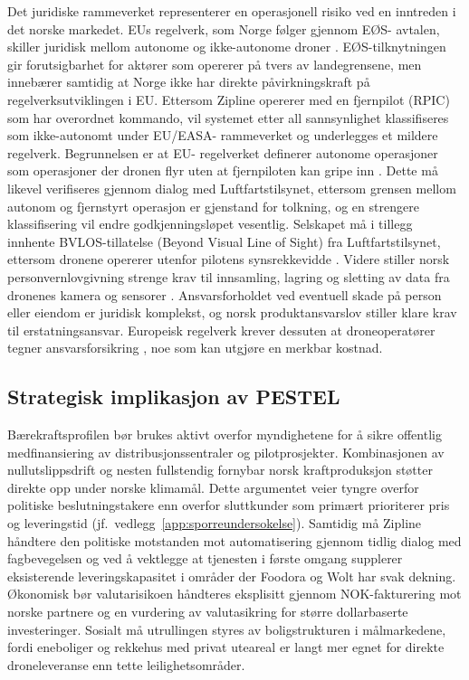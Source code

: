 Det juridiske rammeverket representerer en operasjonell risiko ved en
inntreden i det norske markedet. EUs regelverk, som Norge følger gjennom EØS-%
avtalen, skiller juridisk mellom autonome og ikke-autonome droner
\parencite{euuas2021}. EØS-tilknytningen gir forutsigbarhet for aktører som
opererer på tvers av landegrensene, men innebærer samtidig at Norge ikke
har direkte påvirkningskraft på regelverksutviklingen i EU. Ettersom Zipline
opererer med en fjernpilot (RPIC) som har overordnet kommando, vil systemet
etter all sannsynlighet klassifiseres som ikke-autonomt under EU/EASA-%
rammeverket og underlegges et mildere regelverk. Begrunnelsen er at EU-%
regelverket
definerer autonome operasjoner som operasjoner der dronen flyr uten at
fjernpiloten kan gripe inn \parencite{eu2019_947}. Dette må likevel
verifiseres
gjennom dialog med Luftfartstilsynet, ettersom grensen mellom autonom og
fjernstyrt operasjon er gjenstand for tolkning, og en strengere
klassifisering vil endre godkjenningsløpet vesentlig. Selskapet må i tillegg
innhente BVLOS-tillatelse (Beyond Visual Line of Sight) fra
Luftfartstilsynet, ettersom dronene opererer utenfor pilotens synsrekkevidde
\parencite{luftfartstilsynet2025_aicn0925}. Videre stiller norsk
personvernlovgivning strenge krav til innsamling, lagring og sletting av
data fra dronenes kamera og sensorer \parencite{personopplysningsloven2018}.
Ansvarsforholdet ved eventuell skade på person eller eiendom er juridisk
komplekst, og norsk produktansvarslov stiller klare krav til
erstatningsansvar. Europeisk regelverk krever dessuten at droneoperatører
tegner ansvarsforsikring \parencite{eu785_2004}, noe som kan utgjøre en
merkbar kostnad.

\subsection{Strategisk implikasjon av PESTEL}
Bærekraftsprofilen bør brukes aktivt overfor myndighetene for å sikre
offentlig medfinansiering av distribusjonssentraler og pilotprosjekter.
Kombinasjonen av nullutslippsdrift og nesten fullstendig fornybar norsk
kraftproduksjon støtter direkte opp under norske klimamål.
Dette argumentet veier tyngre overfor politiske beslutningstakere enn overfor sluttkunder som
primært prioriterer pris og leveringstid (jf.\ vedlegg~\ref{app:sporreundersokelse}).
Samtidig må Zipline håndtere den politiske motstanden mot automatisering
gjennom tidlig dialog med fagbevegelsen og ved å vektlegge at tjenesten i
første omgang supplerer eksisterende leveringskapasitet i områder der
Foodora og Wolt har svak dekning.
Økonomisk bør valutarisikoen håndteres eksplisitt gjennom NOK-fakturering
mot norske partnere og en vurdering av valutasikring for større
dollarbaserte investeringer. Sosialt må utrullingen styres av boligstrukturen
i målmarkedene, fordi eneboliger og rekkehus med privat uteareal er langt mer
egnet for direkte droneleveranse enn tette leilighetsområder.

